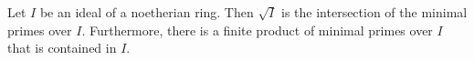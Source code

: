 Let $I$ be an ideal of a noetherian ring. Then $\sqrt{I}$ is the intersection
of the minimal primes over $I$. Furthermore, there is a finite product of minimal
primes over $I$ that is contained in $I$.
